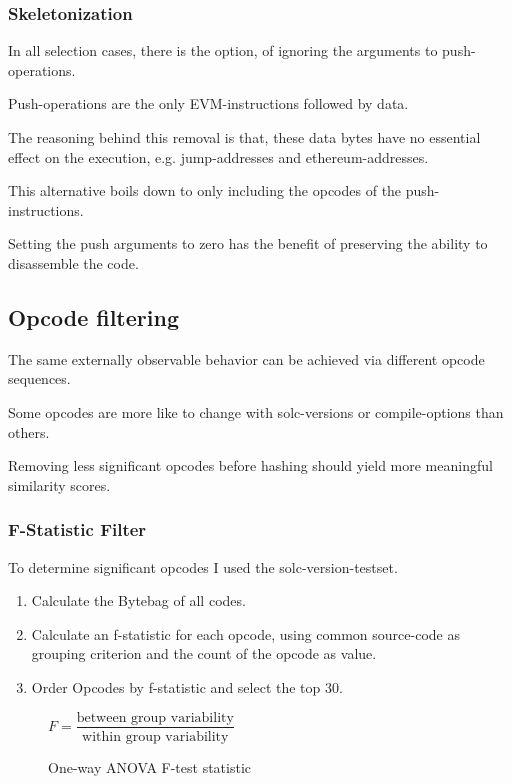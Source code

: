 \documentclass[../main.tex]{subfiles}
\begin{document}
\subsubsection{Skeletonization}
In all selection cases, there is the option, of ignoring the arguments to push-operations.

\begin{ul}
  \item Push-operations are the only EVM-instructions followed by data.
  \item The reasoning behind this removal is that, these data bytes have no essential effect on the execution, e.g. jump-addresses and ethereum-addresses.
  \item This alternative boils down to only including the opcodes of the push-instructions.
  \item Setting the push arguments to zero has the benefit of preserving the ability to disassemble the code.
\end{ul}

\subsection{Opcode filtering}
The same externally observable behavior can be achieved via different opcode sequences.

Some opcodes are more like to change with solc-versions or compile-options than others.

Removing less significant opcodes before hashing should yield more meaningful similarity scores.

\subsubsection{F-Statistic Filter}
To determine significant opcodes I used the solc-version-testset\cite{solc-versions-testset}.

\begin{enumerate}
  \item Calculate the Bytebag of all codes.
  \item Calculate an f-statistic for each opcode, using common source-code as grouping criterion and the count of the opcode as value.
  \item Order Opcodes by f-statistic and select the top 30.
\end{enumerate}

\begin{figure*}[ht!]
  \centering
  \begin{math}
    F = \dfrac{\textrm{between group variability}}{\textrm{within group variability}}
  \end{math}
  \caption{One-way ANOVA F-test statistic}
\end{figure*}
\end{document}
